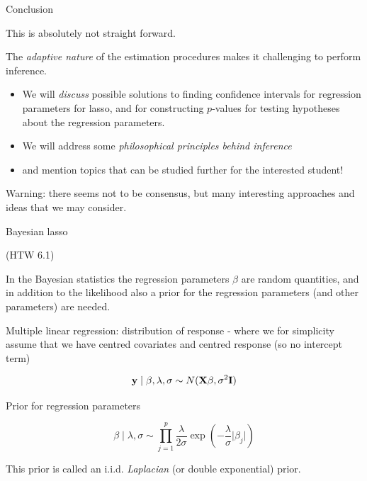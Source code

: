 \documentclass[
  ignorenonframetext,
]{beamer}
\providecommand{\tightlist}{%
  \setlength{\itemsep}{0pt}\setlength{\parskip}{0pt}}
\begin{document}
\begin{frame}

\begin{block}{Conclusion}

This is absolutely not straight forward.

The \emph{adaptive nature} of the estimation procedures makes it
challenging to perform inference.

\begin{itemize}
\tightlist
\item
  We will \emph{discuss} possible solutions to finding confidence
  intervals for regression parameters for lasso, and for constructing
  \(p\)-values for testing hypotheses about the regression parameters.
\item
  We will address some \emph{philosophical principles behind inference}
\item
  and mention topics that can be studied further for the interested
  student!
\end{itemize}

Warning: there seems not to be consensus, but many interesting
approaches and ideas that we may consider.

\end{block}

\end{frame}

\begin{frame}{Bayesian lasso}
\protect\hypertarget{bayesian-lasso}{}

(HTW 6.1)

In the Bayesian statistics the regression parameters \(\beta\) are
random quantities, and in addition to the likelihood also a prior for
the regression parameters (and other parameters) are needed.

Multiple linear regression: distribution of response - where we for
simplicity assume that we have centred covariates and centred response
(so no intercept term)

\[ {\bf y}\mid \beta, \lambda, \sigma \sim N({\bf X}\beta,\sigma^2 {\bf I})\]

Prior for regression parameters

\[\beta \mid \lambda, \sigma \sim \prod_{j=1}^p \frac{\lambda}{2 \sigma}\exp(-\frac{\lambda}{\sigma}\lvert \beta_j \rvert)\]

This prior is called an i.i.d. \emph{Laplacian} (or double exponential)
prior.

\end{frame}
\end{document}
